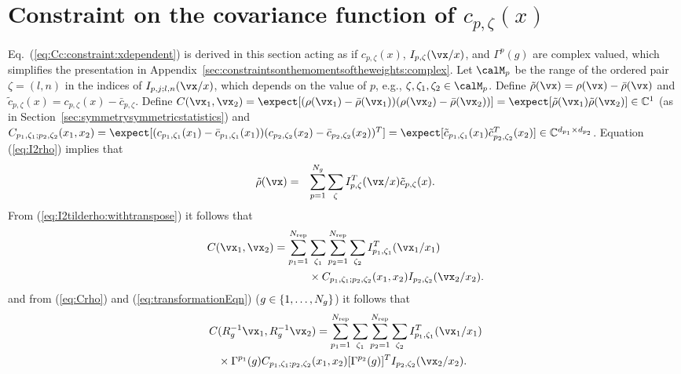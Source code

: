 \section{Constraint on the covariance function of $c_{p,\zeta}(x)$}
\label{sec:covariance:derivation}
Eq.~(\ref{eq:Cc:constraint:xdependent}) is derived in this
section acting as if $c_{p,\zeta}(x)$, $I_{p,\zeta}(\vx/x)$, and
$\Gamma^p(g)$ are complex valued, which simplifies the presentation in
Appendix~\ref{sec:constraintsonthemomentsoftheweights:complex}.
Let $\calM_p$ be the range of the ordered pair $\zeta=(l,n)$ in the indices of
$I_{p,j;l,n}(\vx/x)$, which depends on the value of $p$, e.g.,
$\zeta,\zeta_1,\zeta_2\in\calM_p$.
Define
$\tilde\rho(\vx)=\rho(\vx)-\bar\rho(\vx)$
and
$\tilde c_{p,\zeta}(x)=c_{p,\zeta}(x)-\bar c_{p,\zeta}$.
Define
$\CrhoREAL(\vx_1,\vx_2)=\expect[(\rho(\vx_1)-\bar\rho(\vx_1))(\rho(\vx_2)-\bar\rho(\vx_2))]=\expect[\tilde\rho(\vx_1)\tilde\rho(\vx_2)]\in\mathbb{C}^1$
(as in Section~\ref{sec:symmetrysymmetricstatistics})
and
$\CcREAL(x_1,x_2)=\expect[(c_{p_1,\zeta_1}(x_1)-\bar c_{p_1,\zeta_1}(x_1))
(c_{p_2,\zeta_2}(x_2)-\bar c_{p_2,\zeta_2}(x_2))^T]
=\expect[\tilde c_{p_1,\zeta_1}(x_1)\tilde c_{p_2,\zeta_2}^T(x_2)]
\in\mathbb{C}^{d_{p_1}\times d_{p_2}}$.
Equation (\ref{eq:I2rho}) %
implies that
\begin{eqnarray}
\tilde\rho(\vx)
&=&
\sum_{p=1}^{\Ngroup}
\sum_\zeta
I_{p,\zeta}^T(\vx/x)
\tilde c_{p,\zeta}(x)
\label{eq:I2tilderho:withtranspose}
.
\end{eqnarray}
From (\ref{eq:I2tilderho:withtranspose}) %
it follows that
\begin{align}
\!\begin{aligned}[t]\CrhoREAL(\vx_1,\vx_2)
=
\sum_{p_1=1}^{\Nirrep}
&\sum_{\zeta_1}
\sum_{p_2=1}^{\Nirrep}
\sum_{\zeta_2}
I_{p_1,\zeta_1}^T(\vx_1/x_1)\\
&{}\times\CcREAL(x_1,x_2) I_{p_2,\zeta_2}(\vx_2/x_2).
\end{aligned}
\label{eq:Crho}
\end{align}
and from
(\ref{eq:Crho}) and (\ref{eq:transformationEqn})
($g\in\{1,\dots,N_g\}$) it follows that
\begin{align}
\!\begin{aligned}[t]\CrhoREAL&(R_g^{-1} \vx_1,R_g^{-1} \vx_2)
={\sum_{p_1=1}^{\Nirrep}
\sum_{\zeta_1}
\sum_{p_2=1}^{\Nirrep}
\sum_{\zeta_2}
I_{p_1,\zeta_1}^T(\vx_1/x_1)}\\
&{}\times\Gamma^{p_1}(g){\CcREAL(x_1,x_2)
[\Gamma^{p_2}(g)]^T
I_{p_2,\zeta_2}(\vx_2/x_2)}.
\end{aligned}
\label{eq:rotatedCrho}
\end{align}
